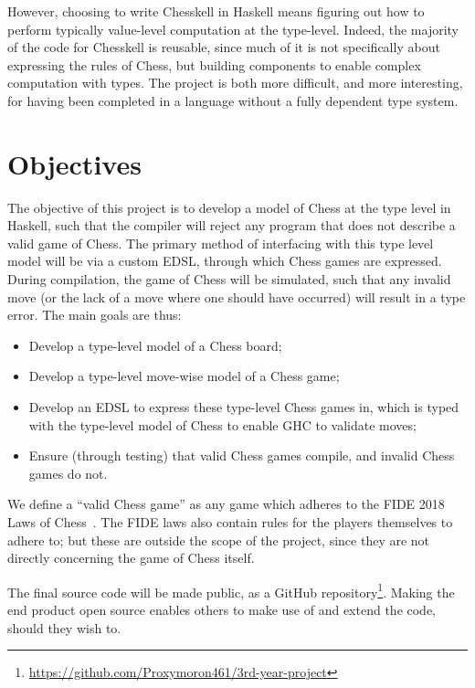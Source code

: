 However, choosing to write Chesskell in Haskell means figuring out how to perform typically value-level computation at the type-level. Indeed, the majority of the code for Chesskell is reusable, since much of it is not specifically about expressing the rules of Chess, but building components to enable complex computation with types. The project is both more difficult, and more interesting, for having been completed in a language without a fully dependent type system.

\section{Objectives} \label{introobjectives}

The objective of this project is to develop a model of Chess at the type level in Haskell, such that the compiler will reject any program that does not describe a valid game of Chess. The primary method of interfacing with this type level model will be via a custom EDSL, through which Chess games are expressed. During compilation, the game of Chess will be simulated, such that any invalid move (or the lack of a move where one should have occurred) will result in a type error. The main goals are thus:

\begin{itemize}
    \item Develop a type-level model of a Chess board;
    \item Develop a type-level move-wise model of a Chess game;
    \item Develop an EDSL to express these type-level Chess games in, which is typed with the type-level model of Chess to enable GHC to validate moves;
    \item Ensure (through testing) that valid Chess games compile, and invalid Chess games do not.
\end{itemize}

We define a ``valid Chess game'' as any game which adheres to the FIDE 2018 Laws of Chess~\cite{lawsofchess}. The FIDE laws also contain rules for the players themselves to adhere to; but these are outside the scope of the project, since they are not directly concerning the game of Chess itself.

The final source code will be made public, as a GitHub repository\footnote{\url{https://github.com/Proxymoron461/3rd-year-project}}. Making the end product open source enables others to make use of and extend the code, should they wish to.
